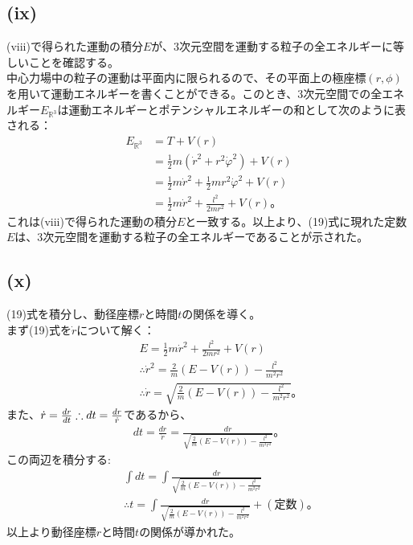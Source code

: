  \subsection*{(ix)}
  (viii)で得られた運動の積分$E$が、3次元空間を運動する粒子の全エネルギーに等しいことを確認する。\\
  中心力場中の粒子の運動は平面内に限られるので、その平面上の極座標$(r,\phi)$を用いて運動エネルギーを書くことができる。このとき、3次元空間での全エネルギー$E_{\mathbb{R}^3}$は運動エネルギーとポテンシャルエネルギーの和として次のように表される：
  \begin{align*}
    E_{\mathbb{R}^3}
    &= T + V(r)\\
    &= \frac12 m\left(\dot r^2+r^2\dot\varphi^2\right)+V(r) \\
    &= \frac12 m\dot r^2+\frac12 mr^2\dot\varphi^2+V(r)\\
    &=\frac12m\dot r^2 +\frac{l^2}{2mr^2}+V(r)。
  \end{align*}
  これは(viii)で得られた運動の積分$E$と一致する。以上より、(19)式に現れた定数$E$は、3次元空間を運動する粒子の全エネルギーであることが示された。

  \subsection*{(x)}
  (19)式を積分し、動径座標$r$と時間$t$の関係を導く。\\
  まず(19)式を$\dot{r}$について解く：
  \begin{align*}
    &\phantom{=} E=\frac{1}{2}m\dot{r}^2+\frac{l^2}{2mr^2}+V(r)\\
    &\phantom{=}\therefore \dot r^2=\frac2m\left(E-V(r)\right)-\frac{l^2}{m^2r^2}\\
    &\phantom{=}\therefore \dot r=\sqrt{\frac2m\left(E-V(r)\right)-\frac{l^2}{m^2r^2}}。
  \end{align*}
  また、$\dot r=\frac{d r}{d t}\therefore dt=\frac{dr}{\dot{r}}$であるから、
  \begin{align*}
    dt=\frac{dr}{\dot{r}}=\frac{dr}{\sqrt{\frac2m\left(E-V(r)\right)-\frac{l^2}{m^2r^2}}}。\tag{20.0}
  \end{align*}
  この両辺を積分する:
  \begin{align*}
    &\phantom{=}\int dt = \int\frac{dr}{\sqrt{\frac2m\left(E-V(r)\right)-\frac{l^2}{m^2r^2}}}\\
    &\phantom{=}\therefore t = \int \frac{dr}{\sqrt{\frac2m\left(E-V(r)\right)-\frac{l^2}{m^2r^2}}} + (定数)。\tag{20}
  \end{align*}
  以上より動径座標$r$と時間$t$の関係が導かれた。
  
